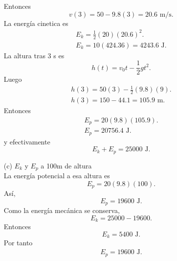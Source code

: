 \documentclass[12pt,a4paper]{article}
\begin{document}
\begin{solucion}
\begin{enumerate}
            Entonces
            \begin{equation*}
                v(3)=50-9.8(3)=20.6\text{ m/s}.
            \end{equation*}
            La energía cinetica es
            \begin{gather*}
                E_{k}=\frac{1}{2}(20)(20.6)^{2}.\\
                E_{k}=10(424.36)=4243.6\text{ J}.
            \end{gather*}
            La altura tras 3 s es
            \begin{equation*}
                h(t)=v_{0}t-\frac{1}{2}gt^{2}.
            \end{equation*}
            Luego
            \begin{gather*}
                h(3)=50(3)-\frac{1}{2}(9.8)(9).\\
                h(3)=150-44.1=105.9\text{ m}.
            \end{gather*}
            Entonces
            \begin{gather*}
                E_{p}=20(9.8)(105.9).\\
                E_{p}=20756.4\text{ J}.
            \end{gather*}
            y efectivamente
            \begin{equation*}
                E_{k}+E_{p}=25000\text{ J}.
            \end{equation*}
            \item[(c)] $E_{k}$ y $E_{p}$ a 100m de altura\\
            La energía potencial a esa altura es
            \begin{equation*}
                E_{p}=20(9.8)(100).
            \end{equation*}
            Así,
            \begin{equation*}
                E_{p}=19600\text{ J}.
            \end{equation*}
            Como la energía mecánica se conserva,
            \begin{equation*}
                E_{k}=25000-19600.
            \end{equation*}
            Entonces
            \begin{equation*}
                E_{k}=5400\text{ J}.
            \end{equation*}
            Por tanto
            \begin{gather*}
                E_{p}=19600\text{ J}.\\

\end{gather*}
\end{enumerate}
\end{solucion}
\end{document}
